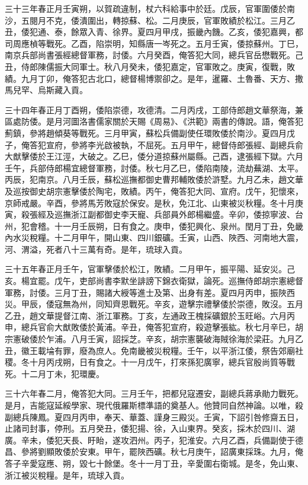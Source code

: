 \begin{pinyinscope}
三十三年春正月壬寅朔，以賀疏違制，杖六科給事中於廷。戊辰，官軍圍倭於南沙，五閱月不克，倭潰圍出，轉掠蘇、松。二月庚辰，官軍敗績於松江。三月乙丑，倭犯通、泰，餘眾入青、徐界。夏四月甲戌，振畿內饑。乙亥，倭犯嘉興，都司周應楨等戰死。乙酉，陷崇明，知縣唐一岑死之。五月壬寅，倭掠蘇州。丁巳，南京兵部尚書張經總督軍務，討倭。六月癸酉，俺答犯大同，總兵官岳懋戰死。己丑，侍郎陳儒振大同軍士。秋八月癸未，倭犯嘉定，官軍敗之。庚寅，復戰，敗績。九月丁卯，俺答犯古北口，總督楊博禦卻之。是年，暹羅、土魯番、天方、撒馬兒罕、烏斯藏入貢。

三十四年春正月丁酉朔，倭陷崇德，攻德清。二月丙戌，工部侍郎趙文華祭海，兼區處防倭。是月河圖洛書儒家關於天賜《周易》、《洪範》兩書的傳說。語，俺答犯薊鎮，參將趙傾葵等戰死。三月甲寅，蘇松兵備副使任環敗倭於南沙。夏四月戊子，俺答犯宣府，參將李光啟被執，不屈死。五月甲午，總督侍郎張經、副總兵俞大猷擊倭於王江涇，大破之。乙巳，倭分道掠蘇州屬縣。己酉，逮張經下獄。六月壬午，兵部侍郎楊宜總督軍務，討倭。秋七月乙巳，倭陷南陵，流劫蕪湖、太平。丙辰，犯南京。八月壬辰，蘇松巡撫都御史曹邦輔敗倭於滸墅。九月乙未，趙文華及巡按御史胡宗憲擊倭於陶宅，敗績。丙午，俺答犯大同、宣府。戊午，犯懷來，京師戒嚴。辛酉，參將馬芳敗寇於保安。是秋，免江北、山東被災秋糧。冬十月庚寅，殺張經及巡撫浙江副都御史李天寵、兵部員外郎楊繼盛。辛卯，倭掠寧波、台州，犯會稽。十一月壬辰朔，日有食之。庚申，倭犯興化、泉州。閏月丁丑，免畿內水災稅糧。十二月甲午，開山東、四川銀礦。壬寅，山西、陜西、河南地大震，河、渭溢，死者八十三萬有奇。是年，琉球入貢。

三十五年春正月壬午，官軍擊倭於松江，敗績。二月甲午，振平陽、延安災。己亥。楊宜罷。戊午，吏部尚書李默坐誹謗下錦衣衛獄，論死。巡撫侍郎胡宗憲總督軍務，討倭。三月丁丑，賜諸大綬等進士及第、出身有差。夏四月丙申，振陜西災。甲辰，倭寇無為州，同知齊恩戰死。辛亥，遊擊宗禮擊倭於崇德，敗沒。五月乙丑，趙文華提督江南、浙江軍務。丁亥，左通政王槐採礦銀於玉旺峪。六月丙申，總兵官俞大猷敗倭於黃浦。辛丑，俺答犯宣府，殺遊擊張紘。秋七月辛巳，胡宗憲破倭於乍浦。八月壬寅，詔採芝。辛亥，胡宗憲襲破海賊徐海於梁莊。九月乙丑，徽王載埨有罪，廢為庶人。免南畿被災稅糧。壬午，以平浙江倭，祭告郊廟社稷。冬十月丙戌朔，日有食之。十一月戊午，打來孫犯廣寧，總兵官殷尚質等戰死。十二月丁未，犯環慶。

三十六年春二月，俺答犯大同。三月壬午，把都兒寇遷安，副總兵蔣承勛力戰死。是月，吉能寇延綏學家、現代俄羅斯標準語的奠基人。他贊同自然神論。以唯，殺副總兵陳鳳。夏四月丙申，奉天、華蓋、謹身三殿災。壬寅，下詔引咎修齋五日，止諸司封事，停刑。五月癸丑，倭犯揚、徐，入山東界。癸亥，採木於四川、湖廣。辛未，倭犯天長、盱眙，遂攻泗州。丙子，犯淮安。六月乙酉，兵備副使于德昌、參將劉顯敗倭於安東。甲午，罷陜西礦。秋七月庚午，詔廣東採珠。九月，俺答子辛愛寇應、朔，毀七十餘堡。冬十一月丁丑，辛愛圍右衛城。是冬，免山東、浙江被災稅糧。是年，琉球入貢。


\end{pinyinscope}
